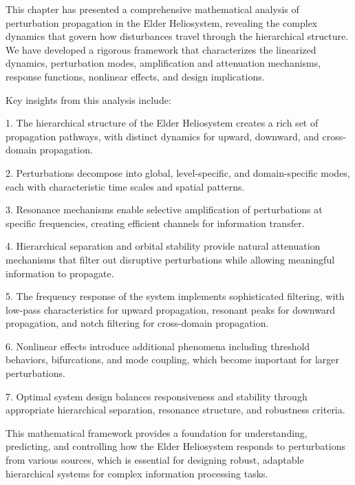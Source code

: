 This chapter has presented a comprehensive mathematical analysis of perturbation propagation in the Elder Heliosystem, revealing the complex dynamics that govern how disturbances travel through the hierarchical structure. We have developed a rigorous framework that characterizes the linearized dynamics, perturbation modes, amplification and attenuation mechanisms, response functions, nonlinear effects, and design implications.

Key insights from this analysis include:

1. The hierarchical structure of the Elder Heliosystem creates a rich set of propagation pathways, with distinct dynamics for upward, downward, and cross-domain propagation.

2. Perturbations decompose into global, level-specific, and domain-specific modes, each with characteristic time scales and spatial patterns.

3. Resonance mechanisms enable selective amplification of perturbations at specific frequencies, creating efficient channels for information transfer.

4. Hierarchical separation and orbital stability provide natural attenuation mechanisms that filter out disruptive perturbations while allowing meaningful information to propagate.

5. The frequency response of the system implements sophisticated filtering, with low-pass characteristics for upward propagation, resonant peaks for downward propagation, and notch filtering for cross-domain propagation.

6. Nonlinear effects introduce additional phenomena including threshold behaviors, bifurcations, and mode coupling, which become important for larger perturbations.

7. Optimal system design balances responsiveness and stability through appropriate hierarchical separation, resonance structure, and robustness criteria.

This mathematical framework provides a foundation for understanding, predicting, and controlling how the Elder Heliosystem responds to perturbations from various sources, which is essential for designing robust, adaptable hierarchical systems for complex information processing tasks.